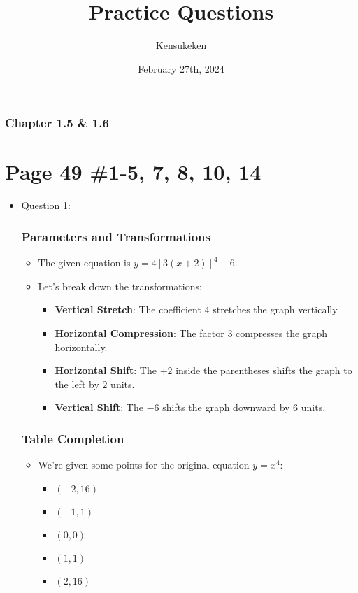 \documentclass{article}
\title{Practice Questions}
\author{Kensukeken}
\date{February 27th, 2024}
\begin{document}
\maketitle
\subsubsection*{Chapter 1.5 \& 1.6}
\section*{Page 49 \#1-5, 7, 8, 10, 14}
\begin{itemize}

\item Question 1:
\subsubsection*{Parameters and Transformations}
\begin{itemize}
    \item The given equation is \(y = 4[3(x + 2)]^4 - 6\).
    \item Let's break down the transformations:
    \begin{itemize}
        \item \textbf{Vertical Stretch}: The coefficient \(4\) stretches the graph vertically.
        \item \textbf{Horizontal Compression}: The factor \(3\) compresses the graph horizontally.
        \item \textbf{Horizontal Shift}: The \(+2\) inside the parentheses shifts the graph to the left by \(2\) units.
        \item \textbf{Vertical Shift}: The \(-6\) shifts the graph downward by \(6\) units.
    \end{itemize}
\end{itemize}

\subsubsection*{Table Completion}
\begin{itemize}
    \item We're given some points for the original equation \(y = x^4\):
    \begin{itemize}
        \item \((-2, 16)\)
        \item \((-1, 1)\)
        \item \((0, 0)\)
        \item \((1, 1)\)
        \item \((2, 16)\)
    \end{itemize}
\end{itemize}


\end{itemize}
\end{document}
